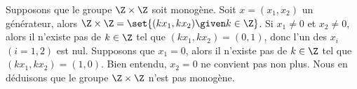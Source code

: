 Supposons que le groupe $\Z \times \Z$ soit monogène. Soit $x = (x_1,x_2)$ un
générateur, alors $\Z \times \Z = \set{(kx_1,kx_2) \given k \in \Z}$.
Si $x_1\neq 0$ et $x_2\neq 0$, alors il n'existe pas de $k\in\Z$ tel que
$(kx_1,kx_2) = (0,1)$, donc l'un des $x_i$ $(i=1,2)$ est nul. Supposons
que $x_1 = 0$, alors il n'existe pas de $k\in\Z$ tel que $(kx_1,kx_2) = (1,0)$.
Bien entendu, $x_2 = 0$ ne convient pas non plus. 
Nous en déduisons que le groupe $\Z \times \Z$ n'est pas monogène.
